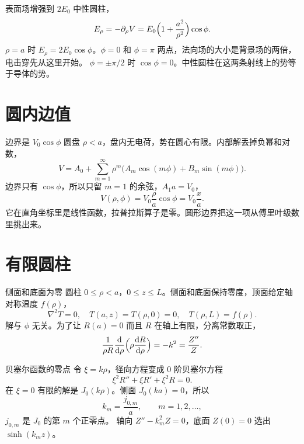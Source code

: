 \documentclass[fontset=windows, chinese, 10pt, xcolor=dvipsnames]{beamer}
\begin{document}
\begin{frame}{表面场增强到 $2E_0$}
  中性圆柱，
  \[
    E_{\rho}=-\partial_{\rho}V
    =E_0\Bigl(1+\frac{a^2}{\rho^2}\Bigr)\cos\phi.
  \]
  $\rho=a$ 时 $E_{\rho}=2E_0\cos\phi$。$\phi=0$ 和 $\phi=\pi$ 两点，法向场的大小是背景场的两倍，电击穿先从这里开始。
  \vspace{0.35em}
  $\phi=\pm\pi/2$ 时 $\cos\phi=0$。中性圆柱在这两条射线上的势等于导体的势。
\end{frame}

\section{圆内边值}

\begin{frame}{边界是 $V_0\cos\phi$}
  圆盘 $\rho<a$，盘内无电荷，势在圆心有限。内部解丢掉负幂和对数，
  \[
    V=A_0+\sum_{m=1}^{\infty}\rho^{m}
      \bigl(A_m\cos(m\phi)+B_m\sin(m\phi)\bigr).
  \]
  边界只有 $\cos\phi$，所以只留 $m=1$ 的余弦，$A_1 a=V_0$，
  \[
    V(\rho,\phi)=V_0\frac{\rho}{a}\cos\phi=V_0\frac{x}{a}.
  \]
  它在直角坐标里是线性函数，拉普拉斯算子是零。圆形边界把这一项从傅里叶级数里挑出来。
\end{frame}

\section{有限圆柱}

\begin{frame}{侧面和底面为零}
  圆柱 $0\leq\rho<a$，$0\leq z\leq L$。侧面和底面保持零度，顶面给定轴对称温度 $f(\rho)$，
  \[
    \nabla^2 T=0,\quad
    T(a,z)=T(\rho,0)=0,\quad
    T(\rho,L)=f(\rho).
  \]
  解与 $\phi$ 无关。为了让 $R(a)=0$ 而且 $R$ 在轴上有限，分离常数取正，
  \[
    \frac{1}{\rho R}\frac{\mathrm{d}}{\mathrm{d}\rho}
      \Bigl(\rho\frac{\mathrm{d}R}{\mathrm{d}\rho}\Bigr)
    =-k^2
    =\frac{Z''}{Z}.
  \]
\end{frame}

\begin{frame}{贝塞尔函数的零点}
  令 $\xi=k\rho$，径向方程变成 $0$ 阶贝塞尔方程
  \[
    \xi^2 R''+\xi R'+\xi^2 R=0.
  \]
  在 $\xi=0$ 有限的解是 $J_0(k\rho)$。侧面 $J_0(ka)=0$，所以
  \[
    k_m=\frac{j_{0,m}}{a},
    \qquad m=1,2,\ldots,
  \]
  $j_{0,m}$ 是 $J_0$ 的第 $m$ 个正零点。
  \vspace{0.3em}
  轴向 $Z''-k_m^2 Z=0$，底面 $Z(0)=0$ 选出 $\sinh(k_m z)$。
\end{frame}
\end{document}
